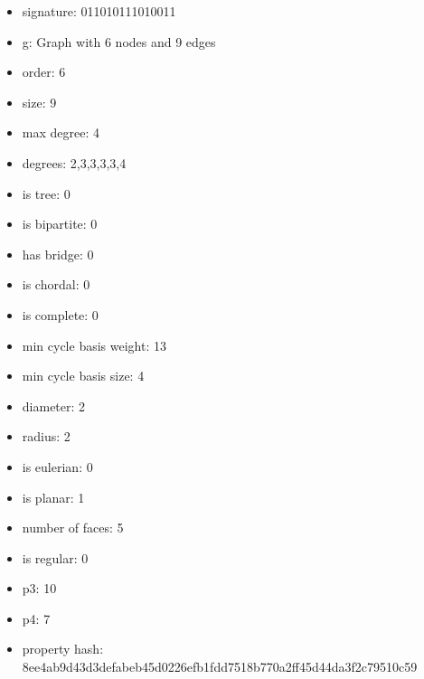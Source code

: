 \begin{itemize}
\item signature: 011010111010011
\item g: Graph with 6 nodes and 9 edges
\item order: 6
\item size: 9
\item max degree: 4
\item degrees: 2,3,3,3,3,4
\item is tree: 0
\item is bipartite: 0
\item has bridge: 0
\item is chordal: 0
\item is complete: 0
\item min cycle basis weight: 13
\item min cycle basis size: 4
\item diameter: 2
\item radius: 2
\item is eulerian: 0
\item is planar: 1
\item number of faces: 5
\item is regular: 0
\item p3: 10
\item p4: 7
\item property hash: 8ee4ab9d43d3defabeb45d0226efb1fdd7518b770a2ff45d44da3f2c79510c59
\end{itemize}
\newpage
